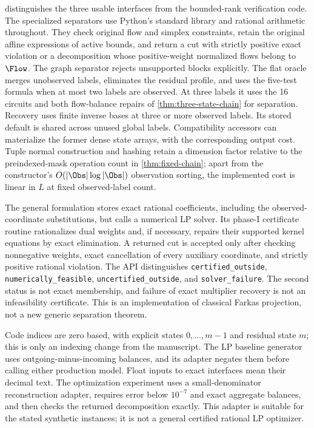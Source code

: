  distinguishes the three usable interfaces
from the bounded-rank verification code. The specialized separators use
Python's standard library and rational arithmetic throughout. They check
original flow and simplex constraints, retain the original affine expressions
of active bounds, and return a cut with strictly positive exact violation
or a decomposition whose positive-weight normalized flows belong to $\Flow$.
The graph separator rejects unsupported blocks explicitly. The flat oracle
merges unobserved labels, eliminates the residual profile, and uses the
five-test formula when at most two labels are observed. At three labels it
uses the 16 circuits and both flow-balance repairs of
\cref{thm:three-state-chain} for separation. Recovery uses finite inverse
bases at three or more observed labels.
Its stored default is shared across unused global labels. Compatibility
accessors can materialize the former dense state arrays, with the corresponding
output cost. Tuple normal construction and hashing retain a dimension factor
relative to the preindexed-mask operation count in \cref{thm:fixed-chain};
apart from the constructor's $O(|\Obs|\log|\Obs|)$ observation sorting,
the implemented cost is linear in $L$ at fixed observed-label count.

The general formulation stores exact rational coefficients, including the
observed-coordinate substitutions, but calls a numerical LP solver.
Its phase-I certificate routine rationalizes dual weights and, if necessary,
repairs their supported kernel equations by exact elimination. A returned
cut is accepted only after checking nonnegative weights, exact cancellation
of every auxiliary coordinate, and strictly positive rational violation.
The API distinguishes \texttt{certified\_outside},
\texttt{numerically\_feasible}, \texttt{uncertified\_outside}, and
\texttt{solver\_failure}. The second status is not exact membership,
and failure of exact multiplier recovery is not an infeasibility certificate.
This is an implementation of classical Farkas projection, not a new generic
separation theorem.

Code indices are zero based, with explicit states $0,\ldots,m-1$ and
residual state $m$; this is only an indexing change from the manuscript.
The LP baseline generator uses outgoing-minus-incoming balances, and its
adapter negates them before calling either production model. Float inputs
to exact interfaces mean their decimal text. The optimization experiment
uses a small-denominator reconstruction adapter, requires error below
$10^{-7}$ and exact aggregate balances, and then checks the returned
decomposition exactly. This adapter is suitable for the stated synthetic
instances; it is not a general certified rational LP optimizer.

